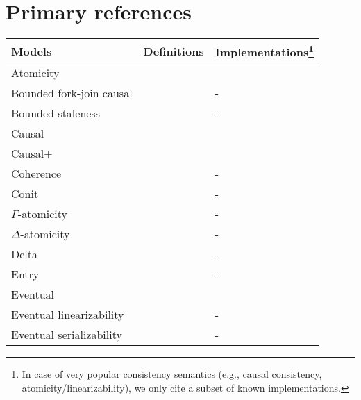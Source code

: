\documentclass[letter, 11pt]{article}
\renewcommand{\cite}{\citep}
\begin{document}
\section{Primary references}
\label{sec:reftable}
\renewcommand{\arraystretch}{1.11}
\begin{center}
	\begin{longtabu}to \textwidth {
                        X[1,l]|
                        X[1.5,l]|
                        X[1.5,l]}
	\hline
		Models           & Definitions              & Implementations\footnote{In case of very popular consistency semantics (e.g., causal consistency, atomicity/linearizability), we only cite a subset of known implementations.} \\
	\hline

		Atomicity       & \cite{Lamport:86:vol2}                & \cite{Attiya.ea:95} \\
		Bounded fork-join causal         & \cite{P-Mahajan.Dahlin:11}                & - \\
		Bounded staleness         & \cite{Mahajan.Setty.ea:10}                & - \\
		Causal         & \cite{Lamport:78,Hutto.Ahamad:90,Ahamad.Neiger.ea:95,P-Mahajan.Dahlin:11}                & \cite{Ladin.ea:92,Birman.ea:91,Lakshmanan.ea:01,Lloyd.Freedma:13,Du.ea:14,Zawirski.ea:15,Lesani.Bell.ea:16} \\ 		Causal+         & \cite{Lloyd.Freedman.ea:11}                & \cite{Petersen.ea:97,Belaramani.ea:06,Almeida.Leitao.ea:13} \\
		Coherence         & \cite{Dubois.Scheurich.ea:86}                & - \\
		Conit         & \cite{Yu.Vahdat:02}                & - \\
				$\Gamma$-atomicity         & \cite{Golab.ea:14}     & - \\ 
		$\Delta$-atomicity         & \cite{Golab.Li.ea:11}                & - \\
		Delta         & \cite{Singla.ea:97}                & - \\
		Entry         & \cite{Bershad.Zekauskas:91}                & - \\
		Eventual        & \cite{Terry.Demers.ea:94,Vogels:08}     & \cite{Reiher.ea:94,DeCandia.Hastorun.ea:07,Singh.ea:09,Bortnikov.Chockler.ea:10,Bronson.ea:13} \\ 		Eventual linearizability         & \cite{Serafini.Dobre.ea:10}                & - \\
		Eventual serializability         & \cite{Fekete.Gupta.ea:96}                & - \\

\end{longtabu}
\end{center}
\end{document}
